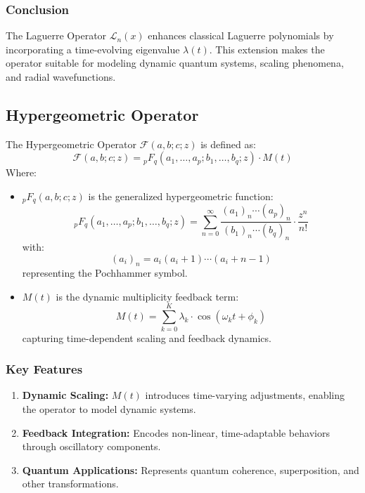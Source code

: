\documentclass{article}
\theoremstyle{plain}
\begin{document}
\begin{itemize}
\subsubsection*{Conclusion}
The Laguerre Operator \( \mathcal{L}_n(x) \) enhances classical Laguerre polynomials by incorporating a time-evolving eigenvalue \( \lambda(t) \). This extension makes the operator suitable for modeling dynamic quantum systems, scaling phenomena, and radial wavefunctions.


\subsection{Hypergeometric Operator}

The Hypergeometric Operator \( \mathcal{F}(a, b; c; z) \) is defined as:
\[
\mathcal{F}(a, b; c; z) = {}_pF_q(a_1, \dots, a_p; b_1, \dots, b_q; z) \cdot M(t)
\]
Where:
\begin{itemize}
    \item \( {}_pF_q(a, b; c; z) \) is the generalized hypergeometric function:
    \[
    {}_pF_q(a_1, \dots, a_p; b_1, \dots, b_q; z) = \sum_{n=0}^\infty \frac{(a_1)_n \cdots (a_p)_n}{(b_1)_n \cdots (b_q)_n} \cdot \frac{z^n}{n!}
    \]
    with:
    \[
    (a_i)_n = a_i (a_i + 1) \cdots (a_i + n - 1)
    \]
    representing the Pochhammer symbol.
    \item \( M(t) \) is the dynamic multiplicity feedback term:
    \[
    M(t) = \sum_{k=0}^K \lambda_k \cdot \cos(\omega_k t + \phi_k)
    \]
    capturing time-dependent scaling and feedback dynamics.
\end{itemize}

\subsubsection*{Key Features}
\begin{enumerate}
    \item \textbf{Dynamic Scaling:} \( M(t) \) introduces time-varying adjustments, enabling the operator to model dynamic systems.
    \item \textbf{Feedback Integration:} Encodes non-linear, time-adaptable behaviors through oscillatory components.
    \item \textbf{Quantum Applications:} Represents quantum coherence, superposition, and other transformations.
\end{enumerate}


\end{itemize}
\end{document}
